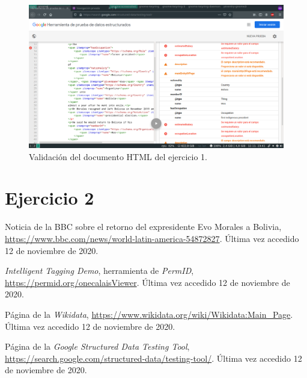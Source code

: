 \documentclass[11pt]{article}
\begin{document}
\begin{figure}[h]
\caption{Validación del documento HTML del ejercicio 1.}
\centering
\includegraphics[width=\textwidth]{validacion-ex1}
\end{figure}

\section{Ejercicio 2}

\begin{thebibliography}{8}
Noticia de la BBC sobre el retorno del expresidente Evo Morales a Bolivia, \url{https://www.bbc.com/news/world-latin-america-54872827}. Última vez accedido 12 de noviembre de 2020.

\textit{Intelligent Tagging Demo}, herramienta de \textit{PermID}, \url{https://permid.org/onecalaisViewer}. Última vez accedido 12 de noviembre de 2020.

Página de la \textit{Wikidata}, \url{https://www.wikidata.org/wiki/Wikidata:Main_Page}. Última vez accedido 12 de noviembre de 2020.

Página de la \textit{Google Structured Data Testing Tool}, \url{https://search.google.com/structured-data/testing-tool/}. Última vez accedido 12 de noviembre de 2020.
\end{thebibliography}
\end{document}
